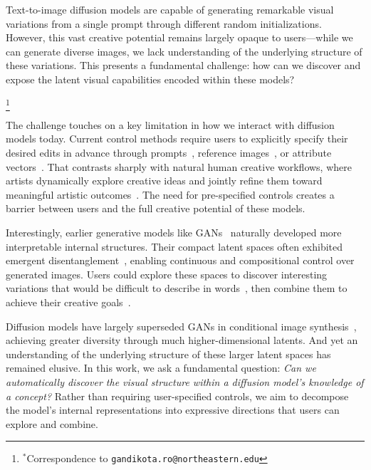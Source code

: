 Text-to-image diffusion models are capable of generating remarkable visual variations from a single prompt through different random initializations. However, this vast creative potential remains largely opaque to users---while we can generate diverse images, we lack understanding of the underlying structure of these variations. This presents a fundamental challenge: how can we discover and expose the latent visual capabilities encoded within these models?

\let\thefootnote\relax \footnote{$^{*}$Correspondence to \texttt{gandikota.ro@northeastern.edu}}

The challenge touches on a key limitation in how we interact with diffusion models today. Current control methods require users to explicitly specify their desired edits in advance through prompts~\cite{gandikota2023concept}, reference images~\cite{zhang2023addingconditionalcontroltexttoimage, chen2024trainingfreeregionalpromptingdiffusion, ruiz2022dreambooth,kumari2022customdiffusion, Ryu_lora, hu2021lora}, or attribute vectors~\cite{ye2023ipadaptertextcompatibleimage, hertz2024stylealignedimagegeneration, li2023photomaker, shi2024instantbooth,parmar2023zero,hertz2022prompt}. That contrasts sharply with natural human creative workflows, where artists dynamically explore creative ideas and jointly refine them toward meaningful artistic outcomes~\cite{hoffmann2016modeling}. The need for pre-specified controls creates a barrier between users and the full creative potential of these models.

Interestingly, earlier generative models like GANs~\cite{gans,karras2019style,brock2018large} naturally developed more interpretable internal structures. Their compact latent spaces often exhibited emergent disentanglement~\cite{harkonen2020ganspace,radford2015unsupervised, wu2021stylespace, shen2020interfacegan}, enabling continuous and compositional control over generated images. Users could explore these spaces to discover interesting variations that would be difficult to describe in words~\cite{wu2021stylespace}, then combine them to achieve their creative goals~\cite{grabe2022towards}.

Diffusion models have largely superseded GANs in conditional image synthesis~\cite{dhariwal2021diffusion}, achieving greater diversity through much higher-dimensional latents. And yet an understanding of the underlying structure of these larger latent spaces has remained elusive. In this work, we ask a fundamental question: \emph{Can we automatically discover the visual structure within a diffusion model's knowledge of a concept?} Rather than requiring user-specified controls, we aim to decompose the model's internal representations into expressive directions that users can explore and combine.

